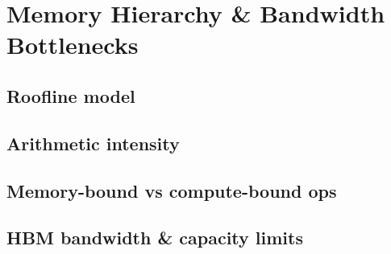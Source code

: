 
\section{Memory Hierarchy \& Bandwidth Bottlenecks}

\subsection{Roofline model}


\subsection{Arithmetic intensity}


\subsection{Memory-bound vs compute-bound ops}


\subsection{HBM bandwidth \& capacity limits}


